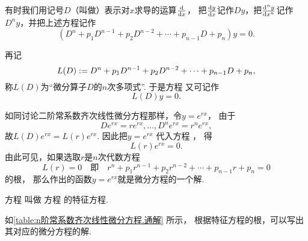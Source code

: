有时我们用记号\(D\)（叫做）表示对\(x\)求导的运算\(\dv{x}\)，
把\(\dv{y}{x}\)记作\(Dy\)，把\(\dv[n]{y}{x}\)记作\(D^n y\)，并把上述方程记作
\begin{equation}\label{equation:微分方程概论.n阶常系数齐次线性微分方程的一般形式.用微分算子改写}
	(D^n + p_1 D^{n-1} + p_2 D^{n-2} + \dotsb + p_{n-1} D + p_n) y = 0.
\end{equation}

再记\begin{equation*}
	L(D) := D^n + p_1 D^{n-1} + p_2 D^{n-2} + \dotsb + p_{n-1} D + p_n,
\end{equation*}
称\(L(D)\)为“微分算子\(D\)的\(n\)次多项式”.
于是方程  又可记作\begin{equation*}
	L(D) y = 0.
\end{equation*}

如同讨论二阶常系数齐次线性微分方程那样，令\(y = e^{rx}\)，
由于\begin{equation*}
	D e^{rx} = r e^{rx},\dotsc,D^n e^{rx} = r^n e^{rx},
\end{equation*}
故\(L(D) e^{rx} = L(r) e^{rx}\).
因此把\(y = e^{rx}\)%
代入方程 ，
得\begin{equation*}
	L(r) e^{rx} = 0.
\end{equation*}
由此可见，如果选取\(r\)是\(n\)次代数方程
\begin{equation}\label{equation:微分方程概论.n阶常系数齐次线性微分方程的一般形式.特征方程}
	L(r) = 0
	\quad\text{即}\quad
	r^n + p_1 r^{n-1} + p_2 r^{n-2} + \dotsb + p_{n-1} r + p_n = 0
\end{equation}的根，
那么作出的函数\(y = e^{rx}\)就是微分方程的一个解.

方程  叫做
方程  的特征方程.

如\cref{table:n阶常系数齐次线性微分方程.通解} 所示，
根据特征方程的根，可以写出其对应的微分方程的解.

